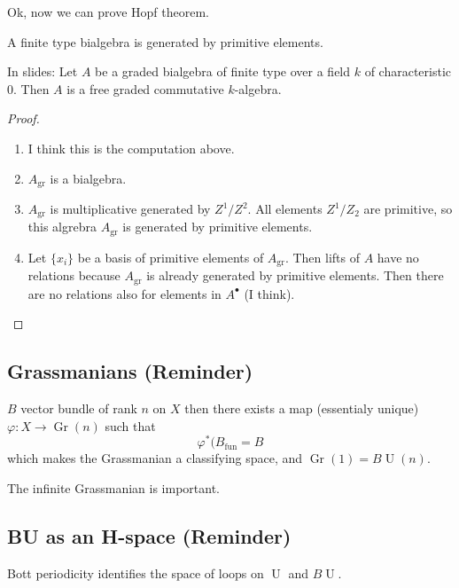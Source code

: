 Ok, now we can prove Hopf theorem.

\begin{thm}\leavevmode
	A finite type bialgebra is generated by primitive elements.

	In slides: Let $A$ be a graded bialgebra of finite type over a field $k$ of characteristic 0. Then $A$ is a free graded commutative $k$-algebra.
\end{thm}

\begin{proof}\leavevmode 
	\begin{enumerate}[label=\textbf{Step \arabic*}]
		\item I think this is the computation above.

		\item $A_{\operatorname{gr}}$ is a bialgebra.

		\item $A_{\operatorname{gr}}$ is multiplicative generated by $Z^1/Z^2$. All elements $Z^1/Z_2$ are primitive, so this algrebra $A_{\operatorname{gr}}$ is generated by primitive elements.

		\item Let $\{x_i\}$ be a basis of primitive elements of $A_{\operatorname{gr}}$. Then lifts of $A$ have no relations because $A_{\operatorname{gr}}$ is already generated by primitive elements. Then there are no relations also for elements in $A^\bullet$ (I think).
	\end{enumerate}
\end{proof}

\subsection{Grassmanians (Reminder)}

$B$ vector bundle of rank $n$ on $X$ then there exists a map (essentialy unique) $\varphi:X\to \operatorname{Gr}(n)$ such that
\[\varphi^* (B_{\operatorname{fun}}=B\]
which makes the Grassmanian a classifying space, and $\operatorname{Gr}(1)=B\operatorname{U}(n)$.

The infinite Grassmanian is important.

\subsection{BU as an H-space (Reminder)}

Bott periodicity identifies the space of loops on $\operatorname{U}$ and $B\operatorname{U}$.


